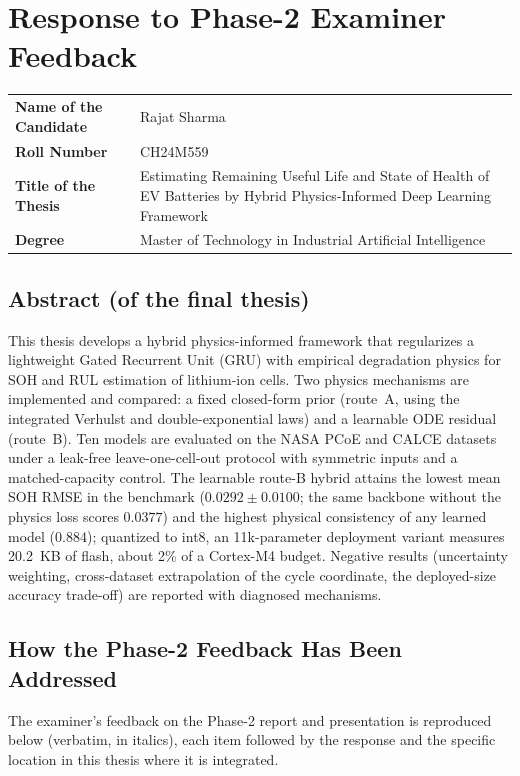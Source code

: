\chapter{Response to Phase-2 Examiner Feedback}
\label{app:examiner-response}

\noindent
\begin{tabular}{@{} >{\bfseries}p{} p{} @{}}
Name of the Candidate & Rajat Sharma \\
Roll Number & CH24M559 \\
Title of the Thesis & Estimating Remaining Useful Life and State of Health of
EV Batteries by Hybrid Physics-Informed Deep Learning Framework \\
Degree & Master of Technology in Industrial Artificial Intelligence \\
\end{tabular}

\section*{Abstract (of the final thesis)}

This thesis develops a hybrid physics-informed framework that regularizes a
lightweight Gated Recurrent Unit (GRU) with empirical degradation physics for
SOH and RUL estimation of lithium-ion cells. Two physics mechanisms are
implemented and compared: a fixed closed-form prior (route~A, using the
integrated Verhulst and double-exponential laws) and a learnable ODE residual
(route~B). Ten models are evaluated on the NASA PCoE and CALCE datasets under
a leak-free leave-one-cell-out protocol with symmetric inputs and a
matched-capacity control. The learnable route-B hybrid attains the lowest mean
SOH RMSE in the benchmark ($0.0292 \pm 0.0100$; the same backbone without the
physics loss scores $0.0377$) and the highest physical consistency of any
learned model ($0.884$); quantized to int8, an 11k-parameter deployment variant
measures 20.2~KB of flash, about 2\% of a Cortex-M4 budget. Negative results
(uncertainty weighting, cross-dataset extrapolation of the cycle coordinate,
the deployed-size accuracy trade-off) are reported with diagnosed mechanisms.

\section*{How the Phase-2 Feedback Has Been Addressed}

The examiner's feedback on the Phase-2 report and presentation is reproduced
below (verbatim, in italics), each item followed by the response and the
specific location in this thesis where it is integrated.

